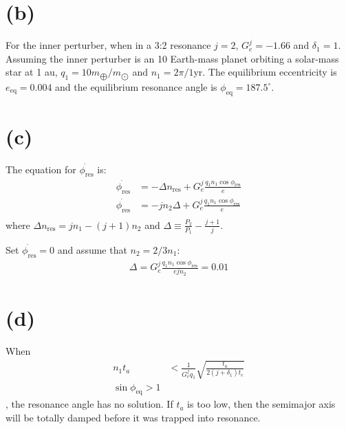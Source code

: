 \documentclass[a4paper,12pt]{article}
\begin{document}
\section*{(b)}
For the inner perturber, when in a 3:2 resonance $j=2$, $G_e^j = -1.66$ and $\delta_1 = 1$.
Assuming the inner perturber is an 10 Earth-mass planet orbiting a solar-mass star at 1 au, 
$q_1 = 10m_{\bigoplus}/m_{\bigodot}$ and $n_1 = 2\pi/1 $yr.
The equilibrium eccentricity is $e_{\text{eq}} = 0.004$ and the equilibrium resonance angle is 
$\phi_{\text{eq}} = 187.5 ^{\circ}$.

\section*{(c)}
The equation for $\dot{\phi_{\text{res}}}$ is:
\begin{align*}
    \dot{\phi_{\text{res}}} &= - \Delta n_{\text{res}} + G_e^j \frac{q_1 n_1 \cos \phi_{\text{res}}}{e} \\
    \dot{\phi_{\text{res}}} &= - jn_2 \Delta + G_e^j \frac{q_1 n_1 \cos \phi_{\text{res}}}{e} \\
\end{align*}
where $\Delta n_{\text{res}} = jn_1 - (j+1) n_2$ and $\Delta \equiv \frac{P_2}{P_1} - \frac{j+1}{j}$.

Set $\dot{\phi_{\text{res}}}=0$ and assume that $n_2 = 2/3 n_1$:
\begin{align*}
    \Delta = G_e^j \frac{q_1 n_1 \cos \phi_{\text{res}}}{ejn_2} = 0.01
\end{align*}

\section*{(d)}
When 
\begin{align*}
    n_1 t_a &< \frac{1}{G_e^j q_1} \sqrt{\frac{t_a}{2(j+ \delta_1)t_e}} \\
    \sin \phi_{\text{eq}} > 1
\end{align*}
, the resonance angle has no solution.
If $t_a$ is too low, then the semimajor axis will be totally damped before it was trapped into resonance.
\end{document}
